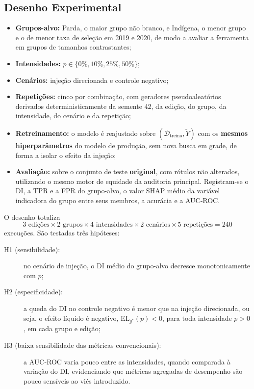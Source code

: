 \subsection{Desenho Experimental}

\begin{itemize}
    \item \textbf{Grupos-alvo:} Parda, o maior grupo não branco, e Indígena, o menor grupo e o de menor taxa de seleção em 2019 e 2020, de modo a avaliar a ferramenta em grupos de tamanhos contrastantes;
    \item \textbf{Intensidades:} $p \in \{0\%, 10\%, 25\%, 50\%\}$;
    \item \textbf{Cenários:} injeção direcionada e controle negativo;
    \item \textbf{Repetições:} cinco por combinação, com geradores pseudoaleatórios derivados deterministicamente da semente 42, da edição, do grupo, da intensidade, do cenário e da repetição;
    \item \textbf{Retreinamento:} o modelo é reajustado sobre $(\mathcal{D}_{\text{treino}}, \tilde{Y})$ com os \textbf{mesmos hiperparâmetros} do modelo de produção, sem nova busca em grade, de forma a isolar o efeito da injeção;
    \item \textbf{Avaliação:} sobre o conjunto de teste \textbf{original}, com rótulos não alterados, utilizando o mesmo motor de equidade da auditoria principal. Registram-se o DI, a TPR e a FPR do grupo-alvo, o valor SHAP médio da variável indicadora do grupo entre seus membros, a acurácia e a AUC-ROC.
\end{itemize}

O desenho totaliza
\begin{equation*}
3 \text{ edições} \times 2 \text{ grupos} \times 4 \text{ intensidades} \times 2 \text{ cenários} \times 5 \text{ repetições} = 240
\end{equation*}
execuções. São testadas três hipóteses:
\begin{description}
    \item[H1 (sensibilidade):] no cenário de injeção, o DI médio do grupo-alvo decresce monotonicamente com $p$;
    \item[H2 (especificidade):] a queda do DI no controle negativo é menor que na injeção direcionada, ou seja, o efeito líquido é negativo, $\mathrm{EL}_{g^{*}}(p) < 0$, para toda intensidade $p > 0$, em cada grupo e edição;
    \item[H3 (baixa sensibilidade das métricas convencionais):] a AUC-ROC varia pouco entre as intensidades, quando comparada à variação do DI, evidenciando que métricas agregadas de desempenho são pouco sensíveis ao viés introduzido.
\end{description}

